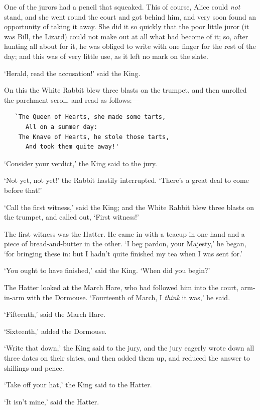 \documentclass[12pt,openany]{memoir}
\begin{document}
One of the jurors had a pencil that squeaked. This of course, Alice could \textit{not} stand, and she went round the court and got behind him, and very soon found an opportunity of taking it away. She did it so quickly that the poor little juror (it was Bill, the Lizard) could not make out at all what had become of it; so, after hunting all about for it, he was obliged to write with one finger for the rest of the day; and this was of very little use, as it left no mark on the slate.

`Herald, read the accusation!' said the King.

On this the White Rabbit blew three blasts on the trumpet, and then unrolled the parchment scroll, and read as follows:---

\begin{verbatim}
   `The Queen of Hearts, she made some tarts,
      All on a summer day:
    The Knave of Hearts, he stole those tarts,
      And took them quite away!'
\end{verbatim}

`Consider your verdict,' the King said to the jury.

`Not yet, not yet!' the Rabbit hastily interrupted. `There's a great deal to come before that!'

`Call the first witness,' said the King; and the White Rabbit blew three blasts on the trumpet, and called out, `First witness!'

The first witness was the Hatter. He came in with a teacup in one hand and a piece of bread-and-butter in the other. `I beg pardon, your Majesty,' he began, `for bringing these in: but I hadn't quite finished my tea when I was sent for.'

`You ought to have finished,' said the King. `When did you begin?'

The Hatter looked at the March Hare, who had followed him into the court, arm-in-arm with the Dormouse. `Fourteenth of March, I \textit{think} it was,' he said.

`Fifteenth,' said the March Hare.

`Sixteenth,' added the Dormouse.

`Write that down,' the King said to the jury, and the jury eagerly wrote down all three dates on their slates, and then added them up, and reduced the answer to shillings and pence.

`Take off your hat,' the King said to the Hatter.

`It isn't mine,' said the Hatter.
\end{document}
